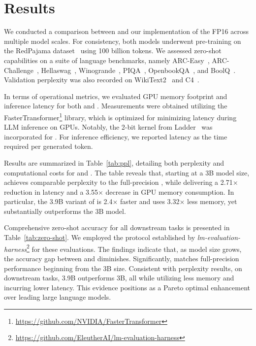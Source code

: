 \section{Results}

We conducted a comparison between  and our implementation of the FP16  across multiple model scales. For consistency, both models underwent pre-training on the RedPajama dataset~\cite{redpajama} using 100 billion tokens. We assessed zero-shot capabilities on a suite of language benchmarks, namely ARC-Easy~\cite{arc}, ARC-Challenge~\cite{arc}, Hellaswag~\cite{hellaswag}, Winogrande~\cite{winoGrande}, PIQA~\cite{piqa}, OpenbookQA~\cite{openbookqa}, and BoolQ~\cite{boolq}. Validation perplexity was also recorded on WikiText2~\cite{wikitext2} and C4~\cite{c4}.

In terms of operational metrics, we evaluated GPU memory footprint and inference latency for both  and . Measurements were obtained utilizing the FasterTransformer\footnote{\url{https://github.com/NVIDIA/FasterTransformer}} library, which is optimized for minimizing latency during LLM inference on GPUs. Notably, the 2-bit kernel from Ladder~\cite{ladder} was incorporated for . For inference efficiency, we reported latency as the time required per generated token.

Results are summarized in Table~\ref{tab:ppl}, detailing both perplexity and computational costs for  and . The table reveals that, starting at a 3B model size,  achieves comparable perplexity to the full-precision , while delivering a 2.71$\times$ reduction in latency and a 3.55$\times$ decrease in GPU memory consumption. In particular, the 3.9B variant of  is 2.4$\times$ faster and uses 3.32$\times$ less memory, yet substantially outperforms the  3B model.

Comprehensive zero-shot accuracy for all downstream tasks is presented in Table~\ref{tab:zero-shot}. We employed the protocol established by \emph{lm-evaluation-harness}\footnote{\url{https://github.com/EleutherAI/lm-evaluation-harness}} for these evaluations. The findings indicate that, as model size grows, the accuracy gap between  and  diminishes. Significantly,  matches full-precision performance beginning from the 3B size. Consistent with perplexity results, on downstream tasks,  3.9B outperforms  3B, all while utilizing less memory and incurring lower latency. This evidence positions  as a Pareto optimal enhancement over leading large language models.

